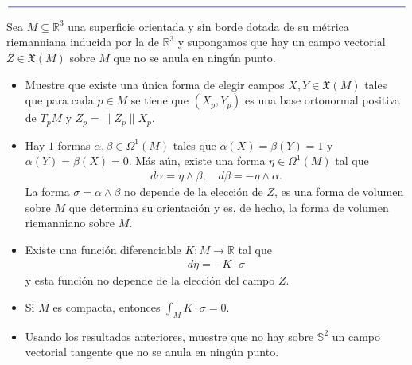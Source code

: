 \documentclass[11pt]{article}
\newcommand{\R}{\mathbb{R}}
\newcommand{\Ss}{\mathbb{S}}
\newcommand{\X}{\mathfrak{X}}
\newcommand{\paint}[1]{\color{color}{#1}}
\newcommand{\paintline}{\begin{center}
$\paint{
\rule{400pt}{0.5pt}
}$
\vspace{10pt}
\end{center}}
\newenvironment{exercise}[2][Ejercicio]{\begin{trivlist}
\item[\hskip \labelsep \paint{{\bfseries #1}}\hskip \labelsep {\bfseries #2.}]}{\end{trivlist}}
\begin{document}
\paintline

\begin{exercise}{7} Sea $M \subseteq \R^3$ una superficie orientada y sin borde dotada de su métrica riemanniana inducida por la de $\R^3$ y supongamos que hay un campo vectorial $Z \in \X(M)$ sobre $M$ que no se anula en ningún punto.
\begin{itemize}[listparindent = \parindent]
\item[(a)] Muestre que existe una única forma de elegir campos $X,Y \in \X(M)$ tales que para cada $p \in M$ se tiene que $(X_p,Y_p)$ es una base ortonormal positiva de $T_pM$ y $Z_p = \|Z_p\|X_p$. 
\item[(b)] Hay $1$-formas $\alpha,\beta\in \Omega^1(M)$ tales que $\alpha(X) = \beta(Y) = 1$ y $\alpha(Y) = \beta(X) = 0$. Más aún, existe una forma $\eta \in \Omega^1(M)$ tal que
\begin{align*}
d\alpha = \eta \wedge \beta, \quad d\beta = -\eta \wedge \alpha.
\end{align*}
La forma $\sigma  = \alpha \wedge \beta$ no depende de la elección de $Z$, es una forma de volumen sobre $M$ que determina su orientación y es, de hecho, la forma de volumen riemanniano sobre $M$.
\item[(c)] Existe una función diferenciable $K : M \to \R$ tal que
\begin{align*}
d\eta = -K \cdot \sigma
\end{align*}
y esta función no depende de la elección del campo $Z$.
\item[(d)] Si $M$ es compacta, entonces $\int_M K \cdot \sigma = 0$.
\item[(e)] Usando los resultados anteriores, muestre que no hay sobre $\Ss^2$ un campo vectorial tangente que no se anula en ningún punto.
\end{itemize}
\end{exercise}
\end{document}
